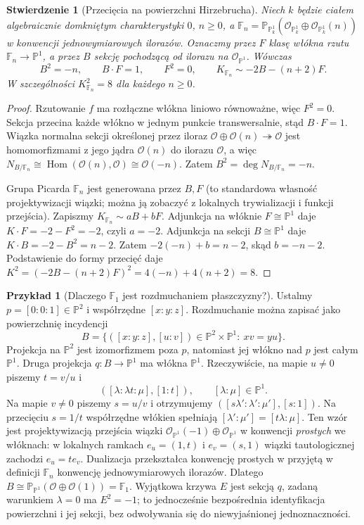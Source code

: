 \documentclass[11pt,a4paper,openany]{report}
\numberwithin{equation}{section}
\theoremstyle{plain}
\newtheorem{stwierdzenie}[twierdzenie]{Stwierdzenie}
\theoremstyle{definition}
\newtheorem{przyklad}[twierdzenie]{Przykład}
\theoremstyle{remark}
\newcommand{\PP}{\mathbb P}
\begin{document}
\begin{stwierdzenie}[Przecięcia na powierzchni Hirzebrucha]
\label{st:ga6-hirzebruch}
Niech $k$ będzie ciałem algebraicznie domkniętym
charakterystyki $0$, $n\ge0$, a $\mathbb F_n=
\PP_{\PP^1_k}(\mathcal O_{\PP^1_k}\oplus\mathcal O_{\PP^1_k}(n))$
w konwencji jednowymiarowych ilorazów. Oznaczmy przez
$F$ klasę włókna rzutu $\mathbb F_n\to\PP^1$,
a przez $B$ sekcję pochodzącą od ilorazu na
$\mathcal O_{\PP^1}$. Wówczas
\[
 B^2=-n,\qquad B\cdot F=1,\qquad F^2=0,
 \qquad K_{\mathbb F_n}\sim-2B-(n+2)F.
\]
W szczególności $K_{\mathbb F_n}^2=8$ dla każdego $n\ge0$.
\end{stwierdzenie}
\begin{proof}
Rzutowanie $f$ ma rozłączne włókna liniowo równoważne,
więc $F^2=0$. Sekcja przecina każde włókno w jednym
punkcie transwersalnie, stąd $B\cdot F=1$.
Wiązka normalna sekcji określonej przez iloraz
$\mathcal O\oplus\mathcal O(n)\twoheadrightarrow\mathcal O$
jest homomorfizmami z jego jądra $\mathcal O(n)$
do ilorazu $\mathcal O$, a więc
$N_{B/\mathbb F_n}\cong\operatorname{Hom}
(\mathcal O(n),\mathcal O)\cong\mathcal O(-n)$.
Zatem $B^2=\deg N_{B/\mathbb F_n}=-n$.

Grupa Picarda $\mathbb F_n$ jest generowana przez
$B,F$ (to standardowa własność projektywizacji
wiązki; można ją zobaczyć z lokalnych trywializacji
i funkcji przejścia). Zapiszmy
$K_{\mathbb F_n}\sim aB+bF$. Adjunkcja na włóknie
$F\cong\PP^1$ daje $K\cdot F=-2-F^2=-2$,
czyli $a=-2$. Adjunkcja na sekcji $B\cong\PP^1$
daje $K\cdot B=-2-B^2=n-2$.
Zatem $-2(-n)+b=n-2$, skąd $b=-n-2$.
Podstawienie do formy przecięć daje
$K^2=(-2B-(n+2)F)^2=4(-n)+4(n+2)=8$.
\end{proof}

\begin{przyklad}[Dlaczego $\mathbb F_1$ jest rozdmuchaniem płaszczyzny?]
\label{prz:ga6-f1}
Ustalmy $p=[0:0:1]\in\PP^2$ i współrzędne $[x:y:z]$.
Rozdmuchanie można zapisać jako powierzchnię incydencji
\[
B=\{([x:y:z],[u:v])\in\PP^2\times\PP^1:\ xv=yu\}.
\]
Projekcja na $\PP^2$ jest izomorfizmem poza $p$, natomiast
jej włókno nad $p$ jest całym $\PP^1$.
Druga projekcja $q:B\to\PP^1$ ma włókna $\PP^1$.
Rzeczywiście, na mapie $u\ne0$ piszemy $t=v/u$ i
\[
([\lambda:\lambda t:\mu],[1:t]),\qquad[\lambda:\mu]\in\PP^1.
\]
Na mapie $v\ne0$ piszemy $s=u/v$ i otrzymujemy
$([s\lambda':\lambda':\mu'],[s:1])$.
Na przecięciu $s=1/t$ współrzędne włókien spełniają
$[\lambda':\mu']=[t\lambda:\mu]$. Ten wzór jest
projektywizacją przejścia wiązki
$\mathcal O_{\PP^1}(-1)\oplus\mathcal O_{\PP^1}$
w konwencji \emph{prostych} we włóknach: w lokalnych
ramkach $e_u=(1,t)$ i $e_v=(s,1)$ wiązki tautologicznej
zachodzi $e_u=t e_v$.
Dualizacja przekształca konwencję prostych w przyjętą
w definicji $\mathbb F_n$ konwencję jednowymiarowych ilorazów.
Dlatego
$B\cong\PP_{\PP^1}(\mathcal O\oplus\mathcal O(1))=\mathbb F_1$.
Wyjątkowa krzywa $E$ jest sekcją $q$, zadaną warunkiem
$\lambda=0$ ma $E^2=-1$; to jednocześnie
bezpośrednia identyfikacja powierzchni i jej sekcji,
bez odwoływania się do niewyjaśnionej jednoznaczności.
\end{przyklad}
\end{document}
